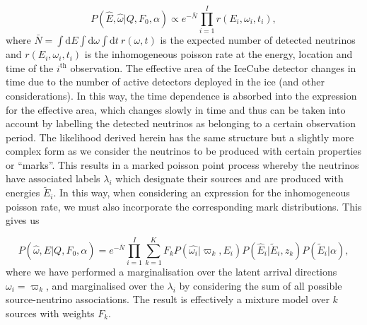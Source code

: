 \documentclass[fontsize=12pt]{article}
\begin{document}
\begin{equation}
P(\hat{E}, \hat{\omega} | Q, F_0, \alpha) \propto e^{-\bar{N}} \prod_{i=1}^{I} r(E_i, \omega_i, t_i),
\end{equation}
where $\bar{N} = \int \mathrm{d}E \int \mathrm{d}\omega \int \mathrm{d}t \ r(\omega, t)$ is the expected number of detected neutrinos and $r(E_i, \omega_i, t_i)$ is the inhomogeneous poisson rate at the energy, location and time of the $i^\mathrm{th}$ observation. The effective area of the IceCube detector changes in time due to the number of active detectors deployed in the ice (and other considerations). In this way, the time dependence is absorbed into the expression for the effective area, which changes slowly in time and thus can be taken into account by labelling the detected neutrinos as belonging to a certain observation period. The likelihood derived herein has the same structure but a slightly more complex form as we consider the neutrinos to be produced with certain properties or ``marks''. This results in a marked poisson point process whereby the neutrinos have associated labels $\lambda_i$ which designate their sources and are produced with energies $\tilde{E}_i$. In this way, when considering an expression for the inhomogeneous poisson rate, we must also incorporate the corresponding mark distributions. This gives us

\begin{equation}
P(\hat{\omega}, \hat{E} | Q, F_0, \alpha) = e^{-\bar{N}}\prod_{i=1}^I \sum_{k=1}^K F_k P(\hat{\omega_i} | \varpi_k, E_i) P(\hat{E}_i | \tilde{E}_i, z_k) P(\tilde{E}_i | \alpha),
\end{equation}
where we have performed a marginalisation over the latent arrival directions $\omega_i = \varpi_k$, and marginalised over the $\lambda_i$ by considering the sum of all possible source-neutrino associations. The result is effectively a mixture model over $k$ sources with weights $F_k$.
\end{document}
